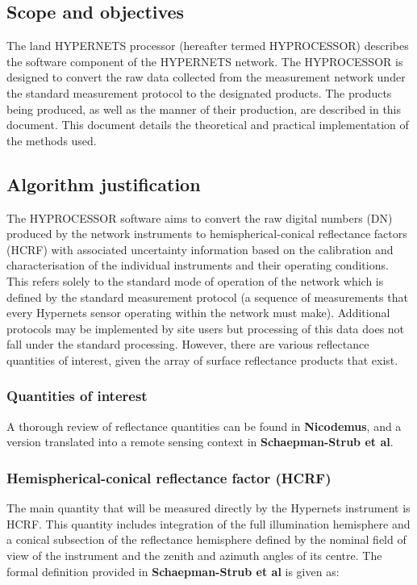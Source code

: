 \subsection{Scope and objectives}
The land HYPERNETS processor (hereafter termed HYPROCESSOR) describes the software component of the HYPERNETS network.
The HYPROCESSOR is designed to convert the raw data collected from the measurement network under the standard measurement protocol to the designated products.
The products being produced, as well as the manner of their production, are described in this document.
This document details the theoretical and practical implementation of the methods used.

\subsection{Algorithm justification}
The HYPROCESSOR software aims to convert the raw digital numbers (DN) produced by the network instruments to hemispherical-conical reflectance factors (HCRF) with associated uncertainty information based on the calibration and characterisation of the individual instruments and their operating conditions.
This refers solely to the standard mode of operation of the network which is defined by the standard measurement protocol (a sequence of measurements that every Hypernets sensor operating within the network must make).
Additional protocols may be implemented by site users but processing of this data does not fall under the standard processing.
However, there are various reflectance quantities of interest, given the array of surface reflectance products that exist.

\subsubsection{Quantities of interest}
A thorough review of reflectance quantities can be found in \textbf{Nicodemus}, and a version translated into a remote sensing context in \textbf{Schaepman-Strub et al}.

\subsubsection*{Hemispherical-conical reflectance factor (HCRF)}
The main quantity that will be measured directly by the Hypernets instrument is HCRF.
This quantity includes integration of the full illumination hemisphere and a conical subsection of the reflectance hemisphere defined by the nominal field of view of the instrument and the zenith and azimuth angles of its centre.
The formal definition provided in \textbf{Schaepman-Strub et al} is given as:


